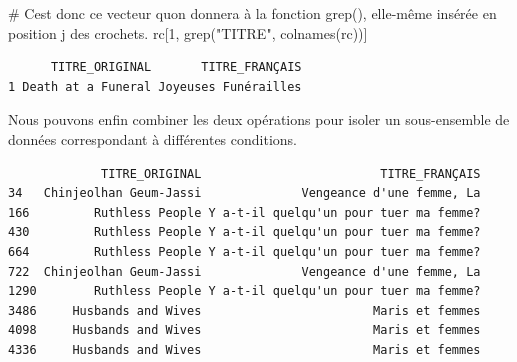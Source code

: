 \documentclass[
  letterpaper,
  DIV=11,
  numbers=noendperiod]{scrartcl}
\newenvironment{Shaded}{\begin{snugshade}}{\end{snugshade}}
\newcommand{\AttributeTok}[1]{\textcolor[rgb]{0.40,0.45,0.13}{#1}}
\newcommand{\CommentTok}[1]{\textcolor[rgb]{0.37,0.37,0.37}{#1}}
\newcommand{\DecValTok}[1]{\textcolor[rgb]{0.68,0.00,0.00}{#1}}
\newcommand{\FunctionTok}[1]{\textcolor[rgb]{0.28,0.35,0.67}{#1}}
\newcommand{\NormalTok}[1]{\textcolor[rgb]{0.00,0.23,0.31}{#1}}
\newcommand{\SpecialCharTok}[1]{\textcolor[rgb]{0.37,0.37,0.37}{#1}}
\newcommand{\StringTok}[1]{\textcolor[rgb]{0.13,0.47,0.30}{#1}}
\begin{document}
\begin{Shaded}
\begin{Highlighting}[]
\CommentTok{\# C\textquotesingle{}est donc ce vecteur qu\textquotesingle{}on donnera à la fonction \textasciigrave{}grep()\textasciigrave{}, elle{-}même insérée en position \textasciigrave{}j\textasciigrave{} des crochets. }
\NormalTok{rc[}\DecValTok{1}\NormalTok{, }\FunctionTok{grep}\NormalTok{(}\StringTok{"TITRE"}\NormalTok{, }\FunctionTok{colnames}\NormalTok{(rc))]}
\end{Highlighting}
\end{Shaded}

\begin{verbatim}
      TITRE_ORIGINAL       TITRE_FRANÇAIS
1 Death at a Funeral Joyeuses Funérailles
\end{verbatim}

Nous pouvons enfin combiner les deux opérations pour isoler un
sous-ensemble de données correspondant à différentes conditions.

\begin{Shaded}
\end{Shaded}

\begin{verbatim}
             TITRE_ORIGINAL                         TITRE_FRANÇAIS
34   Chinjeolhan Geum-Jassi              Vengeance d'une femme, La
166         Ruthless People Y a-t-il quelqu'un pour tuer ma femme?
430         Ruthless People Y a-t-il quelqu'un pour tuer ma femme?
664         Ruthless People Y a-t-il quelqu'un pour tuer ma femme?
722  Chinjeolhan Geum-Jassi              Vengeance d'une femme, La
1290        Ruthless People Y a-t-il quelqu'un pour tuer ma femme?
3486     Husbands and Wives                        Maris et femmes
4098     Husbands and Wives                        Maris et femmes
4336     Husbands and Wives                        Maris et femmes
\end{verbatim}
\end{document}
